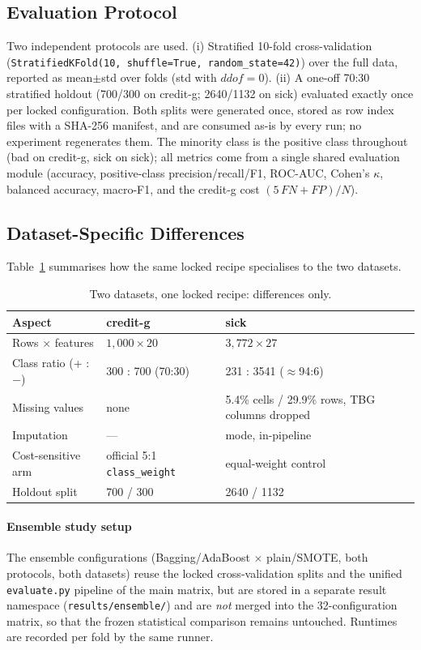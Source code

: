 \subsection{Evaluation Protocol}
Two independent protocols are used. (i) Stratified 10-fold
cross-validation (\texttt{StratifiedKFold(10, shuffle=True,
random\_state=42)}) over the full data, reported as mean$\pm$std over
folds (std with $ddof=0$). (ii) A one-off 70:30 stratified holdout
(700/300 on credit-g; 2640/1132 on sick) evaluated exactly once per
locked configuration. Both splits were generated once, stored as row
index files with a SHA-256 manifest, and are consumed as-is by every
run; no experiment regenerates them. The minority class is the
positive class throughout (bad on credit-g, sick on sick); all metrics
come from a single shared evaluation module (accuracy, positive-class
precision/recall/F1, ROC-AUC, Cohen's $\kappa$, balanced accuracy,
macro-F1, and the credit-g cost $(5\,\mathit{FN}+\mathit{FP})/N$).

\subsection{Dataset-Specific Differences}
Table~\ref{tab:pipeline-diff} summarises how the same locked recipe
specialises to the two datasets.
\begin{table}[htbp]\centering\small
\caption{Two datasets, one locked recipe: differences only.}
\label{tab:pipeline-diff}
\begin{tabular}{lll}
\toprule
Aspect & credit-g & sick \\
\midrule
Rows $\times$ features & $1{,}000\times 20$ & $3{,}772\times 27$ \\
Class ratio (+ : $-$) & 300 : 700 (70:30) & 231 : 3541 ($\approx$94:6) \\
Missing values & none & 5.4\% cells / 29.9\% rows, TBG columns dropped \\
Imputation & --- & mode, in-pipeline \\
Cost-sensitive arm & official 5:1 \texttt{class\_weight} & equal-weight control \\
Holdout split & 700 / 300 & 2640 / 1132 \\
\bottomrule
\end{tabular}
\end{table}

\paragraph{Ensemble study setup}
The ensemble configurations (Bagging/AdaBoost $\times$ plain/SMOTE,
both protocols, both datasets) reuse the locked cross-validation splits
and the unified \texttt{evaluate.py} pipeline of the main matrix, but
are stored in a separate result namespace (\texttt{results/ensemble/})
and are \emph{not} merged into the 32-configuration matrix, so that the
frozen statistical comparison remains untouched. Runtimes are recorded
per fold by the same runner.
